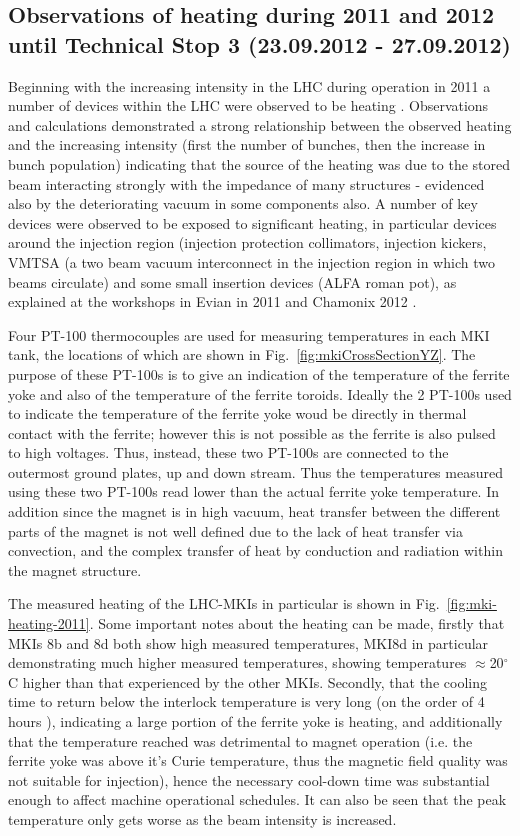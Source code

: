 \subsection{Observations of heating during 2011 and 2012 until Technical Stop 3 (23.09.2012 - 27.09.2012)}

Beginning with the increasing intensity in the LHC during operation in 2011 a number of devices within the LHC were observed to be heating \cite{ Salvant:Heating, Metral:Heating}. Observations and calculations demonstrated a strong relationship between the observed heating and the increasing intensity (first the number of bunches, then the increase in bunch population) indicating that the source of the heating was due to the stored beam interacting strongly with the impedance of many structures - evidenced also by the deteriorating vacuum in some components also. A number of key devices were observed to be exposed to significant heating, in particular devices around the injection region (injection protection collimators, injection kickers, VMTSA (a two beam vacuum interconnect in the injection region in which two beams circulate) and some small insertion devices (ALFA roman pot), as explained at the workshops in Evian in 2011 \cite{Salvant:Heating} and Chamonix 2012 \cite{Metral:Heating}. 

Four PT-100 thermocouples are used for measuring temperatures in each MKI tank, the locations of which are shown in Fig.~\ref{fig:mkiCrossSectionYZ}. The purpose of these PT-100s is to give an indication of the temperature of the ferrite yoke and also of the temperature of the ferrite toroids. Ideally the 2 PT-100s used to indicate the temperature of the ferrite yoke woud be directly in thermal contact with the ferrite; however this is not possible as the ferrite is also pulsed to high voltages. Thus, instead, these two PT-100s are connected to the outermost ground plates, up and down stream. Thus the temperatures measured using these two PT-100s read lower than the actual ferrite yoke temperature. In addition since the magnet is in high vacuum, heat transfer between the different parts of the magnet is not well defined due to the lack of heat transfer via convection, and the complex transfer of heat by conduction and radiation within the magnet structure.

The measured heating of the LHC-MKIs in particular is shown in Fig.~\ref{fig:mki-heating-2011}. Some important notes about the heating can be made, firstly that MKIs 8b and 8d both show high measured temperatures, MKI8d in particular demonstrating much higher measured temperatures, showing temperatures $\approx$20$^{\circ}$C higher than that experienced by the other MKIs. Secondly, that the cooling time to return below the interlock temperature is very long (on the order of 4 hours \cite{Goddard:timeConst}), indicating a large portion of the ferrite yoke is heating, and additionally that the temperature reached was detrimental to magnet operation (i.e. the ferrite yoke was above it's Curie temperature, thus the magnetic field quality was not suitable for injection), hence the necessary cool-down time was substantial enough to affect machine operational schedules. It can also be seen that the peak temperature only gets worse as the beam intensity is increased.

